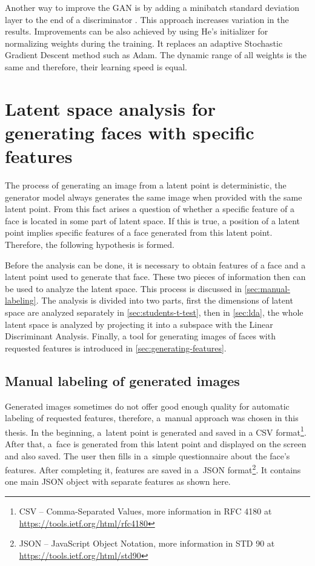 Another way to improve the GAN is by adding a minibatch standard deviation layer to the end of a discriminator \cite{karras2017progressive}. This approach increases variation in the results. Improvements can be also achieved by using He's initializer for normalizing weights during the training. It replaces an adaptive Stochastic Gradient Descent method such as Adam. The dynamic range of all weights is the same and therefore, their learning speed is equal.

\chapter{\label{chap:analysis}Latent space analysis for generating faces with specific features}
The process of generating an image from a latent point is deterministic, the generator model always generates the same image when provided with the same latent point. From this fact arises a question of whether a specific feature of a face is located in some part of latent space. If this is true, a position of a latent point implies specific features of a face generated from this latent point. Therefore, the following hypothesis is formed. 

Before the analysis can be done, it is necessary to obtain features of a face and a latent point used to generate that face. These two pieces of information then can be used to analyze the latent space. This process is discussed in \autoref{sec:manual-labeling}. The analysis is divided into two parts, first the dimensions of latent space are analyzed separately in \autoref{sec:students-t-test}, then in \autoref{sec:lda}, the whole latent space is analyzed by projecting it into a subspace with the Linear Discriminant Analysis. Finally, a tool for generating images of faces with requested features is introduced in \autoref{sec:generating-features}.

\section{\label{sec:manual-labeling}Manual labeling of generated images}
Generated images sometimes do not offer good enough quality for automatic labeling of requested features, therefore, a~manual approach was chosen in this thesis. In the beginning, a~latent point is generated and saved in a CSV format\footnote{CSV – Comma-Separated Values, more information in RFC 4180 at \url{https://tools.ietf.org/html/rfc4180}}. After that, a~face is generated from this latent point and displayed on the screen and also saved. The user then fills in a~simple questionnaire about the face's features. After completing it, features are saved in a~JSON format\footnote{JSON – JavaScript Object Notation, more information in STD 90 at \url{https://tools.ietf.org/html/std90}}. It contains one main JSON object with separate features as shown here.

